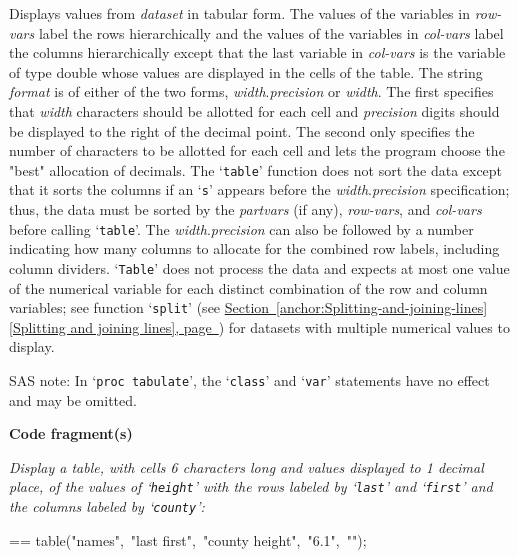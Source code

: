 \documentclass{book}
\makeatletter
\newcommand\Texinfocommandstyletextvar[1]{{\normalfont{}\textsl{#1}}}%
\newenvironment{Texinfopreformatted}{%
  \par\GNUTobeylines\obeyspaces\frenchspacing\parskip=\z@\parindent=\z@}{}
{\catcode`\^^M=13 \gdef\GNUTobeylines{\catcode`\^^M=13 \def^^M{\null\par}}}
\newenvironment{Texinfoindented}{\begin{list}{}{}\item\relax}{\end{list}}
\renewcommand{\_}{\Texinfounderscore\discretionary{}{}{}}
\makeatother
\begin{document}
Displays values from \Texinfocommandstyletextvar{dataset} in tabular form.
The values of the variables in \Texinfocommandstyletextvar{row-vars} label the rows hierarchically and
the values of the variables in \Texinfocommandstyletextvar{col-vars} label the columns hierarchically
except that the last variable in \Texinfocommandstyletextvar{col-vars} is the variable of type double
whose values are displayed in the cells of the table.
The string \Texinfocommandstyletextvar{format} is of either of the two forms,
\Texinfocommandstyletextvar{width}.\Texinfocommandstyletextvar{precision} or \Texinfocommandstyletextvar{width}.
The first specifies that \Texinfocommandstyletextvar{width} characters
should be allotted for each cell and \Texinfocommandstyletextvar{precision} digits should be displayed to the right
of the decimal point.
The second only specifies the number of characters to be allotted for each cell
and lets the program choose the "best" allocation of decimals.
The `\texttt{table}' function does not sort the data except that it sorts the columns if an
`\texttt{s}' appears before the \Texinfocommandstyletextvar{width}.\Texinfocommandstyletextvar{precision} specification; thus, the data must be sorted by
the \Texinfocommandstyletextvar{partvars} (if any), \Texinfocommandstyletextvar{row-vars}, and \Texinfocommandstyletextvar{col-vars} before calling `\texttt{table}'.
The \Texinfocommandstyletextvar{width}.\Texinfocommandstyletextvar{precision} can also be followed by
a number indicating how many columns to allocate for the combined
row labels, including column dividers.
`\texttt{Table}' does not process the data and expects at most one value of the
numerical variable for each distinct combination
of the row and column variables; see function `\texttt{split}'
(see \hyperref[anchor:Splitting-and-joining-lines]{Section~\ref*{anchor:Splitting-and-joining-lines} [Splitting and joining lines], page~\pageref*{anchor:Splitting-and-joining-lines}}) for datasets with multiple numerical
values to display.

SAS note: In `\texttt{proc tabulate}', the `\texttt{class}' and `\texttt{var}' statements have no effect and may be omitted.

\noindent{}\textbf{Code fragment(s)}

\emph{Display a table, with cells 6 characters long and values displayed
to 1 decimal place,
of the values of `\texttt{height}' with the rows
labeled by `\texttt{last}' and `\texttt{first}' and the columns labeled by
`\texttt{county}':}
\begin{Texinfoindented}
\begin{Texinfopreformatted}%
\ttfamily table("names",\ "last first",\ "county height",\ "6.1",\ "");
\end{Texinfopreformatted}
\end{Texinfoindented}
\end{document}
